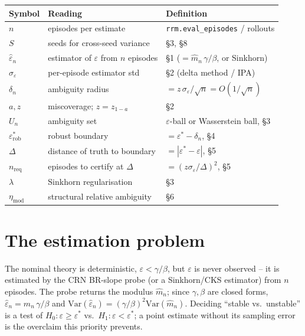 \documentclass[11pt]{article}
\newcommand{\eps}{\varepsilon}
\newcommand{\epshat}{\hat\eps_n}
\newcommand{\mhat}{\hat m_n}
\newcommand{\dn}{\delta_n}
\newcommand{\code}[1]{\texttt{#1}}
\newcommand{\epsstar}{\eps^{*}}
\newcommand{\epsrob}{\eps^{*}_{\mathrm{rob}}}
\begin{document}
\begin{center}
\begin{tabular}{@{}lll@{}}
\toprule
Symbol & Reading & Definition \\
\midrule
$n$        & episodes per estimate                & \code{rrm.eval\_episodes} / rollouts \\
$S$        & seeds for cross-seed variance        & \S3, \S8 \\
$\epshat$  & estimator of $\eps$ from $n$ episodes & \S1 ($=\mhat\,\gamma/\beta$, or Sinkhorn) \\
$\sigma_\eps$ & per-episode estimator std          & \S2 (delta method / IPA) \\
$\dn$      & ambiguity radius                      & $=z\,\sigma_\eps/\sqrt{n}=O(1/\sqrt{n})$ \\
$a,z$      & miscoverage; $z=z_{1-a}$              & \S2 \\
$U_n$      & ambiguity set                         & $\eps$-ball or Wasserstein ball, \S3 \\
$\epsrob$  & robust boundary                       & $=\epsstar-\dn$, \S4 \\
$\Delta$   & distance of truth to boundary         & $=|\epsstar-\eps|$, \S5 \\
$n_{\mathrm{req}}$ & episodes to certify at $\Delta$ & $=(z\sigma_\eps/\Delta)^2$, \S5 \\
$\lambda$  & Sinkhorn regularisation               & \S3 \\
$\eta_{\mathrm{mod}}$ & structural relative ambiguity & \S6 \\
\bottomrule
\end{tabular}
\end{center}

\section{The estimation problem}

The nominal theory is deterministic, $\eps<\gamma/\beta$, but $\eps$ is never
observed -- it is estimated by the CRN BR-slope probe (or a Sinkhorn/CKS estimator)
from $n$ episodes. The probe returns the modulus $\mhat$; since $\gamma,\beta$ are
closed forms, $\epshat=\mhat\,\gamma/\beta$ and
$\mathrm{Var}(\epshat)=(\gamma/\beta)^2\mathrm{Var}(\mhat)$. Deciding
``stable vs.\ unstable'' is a test of $H_0:\eps\ge\epsstar$ vs.\ $H_1:\eps<\epsstar$;
a point estimate without its sampling error is the overclaim this priority prevents.
\end{document}

